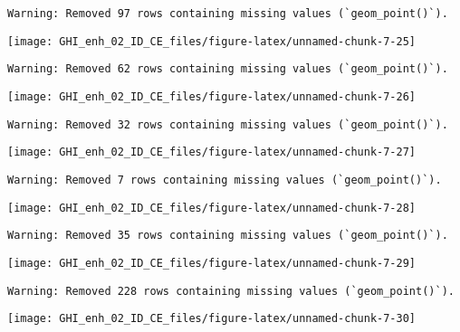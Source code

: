 \documentclass[
  10pt,
  a4paper,oneside]{article}
\begin{document}
\begin{verbatim}
Warning: Removed 97 rows containing missing values (`geom_point()`).
\end{verbatim}

\begin{center}\texttt{[image: GHI\_enh\_02\_ID\_CE\_files/figure-latex/unnamed-chunk-7-25]} \end{center}

\begin{verbatim}
Warning: Removed 62 rows containing missing values (`geom_point()`).
\end{verbatim}

\begin{center}\texttt{[image: GHI\_enh\_02\_ID\_CE\_files/figure-latex/unnamed-chunk-7-26]} \end{center}

\begin{verbatim}
Warning: Removed 32 rows containing missing values (`geom_point()`).
\end{verbatim}

\begin{center}\texttt{[image: GHI\_enh\_02\_ID\_CE\_files/figure-latex/unnamed-chunk-7-27]} \end{center}

\begin{verbatim}
Warning: Removed 7 rows containing missing values (`geom_point()`).
\end{verbatim}

\begin{center}\texttt{[image: GHI\_enh\_02\_ID\_CE\_files/figure-latex/unnamed-chunk-7-28]} \end{center}

\begin{verbatim}
Warning: Removed 35 rows containing missing values (`geom_point()`).
\end{verbatim}

\begin{center}\texttt{[image: GHI\_enh\_02\_ID\_CE\_files/figure-latex/unnamed-chunk-7-29]} \end{center}

\begin{verbatim}
Warning: Removed 228 rows containing missing values (`geom_point()`).
\end{verbatim}

\begin{center}\texttt{[image: GHI\_enh\_02\_ID\_CE\_files/figure-latex/unnamed-chunk-7-30]} \end{center}
\end{document}
